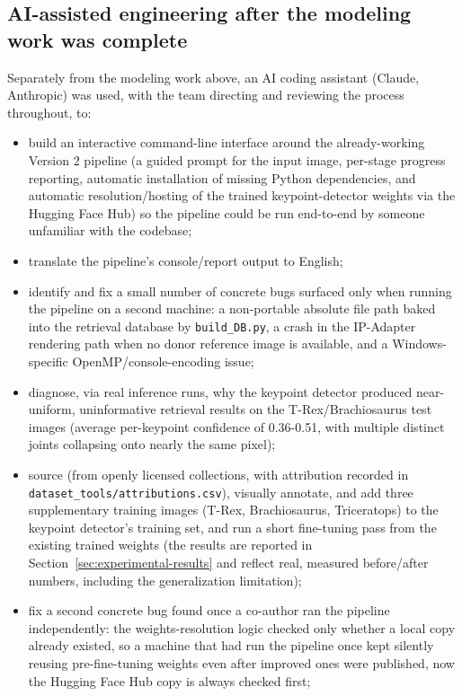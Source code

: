 \documentclass{article}
\begin{document}
\subsection{AI-assisted engineering after the modeling work was complete}
Separately from the modeling work above, an AI coding assistant (Claude, Anthropic) was used, with the team directing and reviewing the process throughout, to:
\begin{itemize}
    \item build an interactive command-line interface around the already-working Version 2 pipeline (a guided prompt for the input image, per-stage progress reporting, automatic installation of missing Python dependencies, and automatic resolution/hosting of the trained keypoint-detector weights via the Hugging Face Hub) so the pipeline could be run end-to-end by someone unfamiliar with the codebase;
    \item translate the pipeline's console/report output to English;
    \item identify and fix a small number of concrete bugs surfaced only when running the pipeline on a second machine: a non-portable absolute file path baked into the retrieval database by \texttt{build\_DB.py}, a crash in the IP-Adapter rendering path when no donor reference image is available, and a Windows-specific OpenMP/console-encoding issue;
    \item diagnose, via real inference runs, why the keypoint detector produced near-uniform, uninformative retrieval results on the T-Rex/Brachiosaurus test images (average per-keypoint confidence of 0.36-0.51, with multiple distinct joints collapsing onto nearly the same pixel);
    \item source (from openly licensed collections, with attribution recorded in \texttt{dataset\_tools/attributions.csv}), visually annotate, and add three supplementary training images (T-Rex, Brachiosaurus, Triceratops) to the keypoint detector's training set, and run a short fine-tuning pass from the existing trained weights (the results are reported in Section~\ref{sec:experimental-results} and reflect real, measured before/after numbers, including the generalization limitation);
    \item fix a second concrete bug found once a co-author ran the pipeline independently: the weights-resolution logic checked only whether a local copy already existed, so a machine that had run the pipeline once kept silently reusing pre-fine-tuning weights even after improved ones were published, now the Hugging Face Hub copy is always checked first;

\end{itemize}
\end{document}
